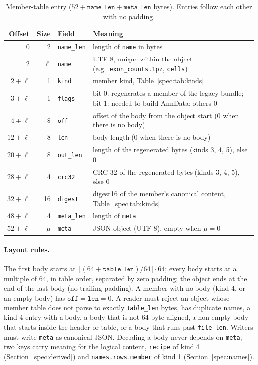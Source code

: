 \begin{table}[htbp]
\centering\footnotesize\setlength{\tabcolsep}{4pt}
\caption{Member-table entry ($52+\texttt{name\_len}+\texttt{meta\_len}$ bytes). Entries follow each other with no padding.}
\label{spec:tab:entry}
\begin{tabularx}{\linewidth}{@{}rrlX@{}}
\toprule
Offset & Size & Field & Meaning \\
\midrule
0     & 2  & \texttt{name\_len} & length of \texttt{name} in bytes \\
2     & $\ell$ & \texttt{name}  & UTF-8, unique within the object (e.g.\ \texttt{exon\_counts.1pz}, \texttt{cells}) \\
$2+\ell$  & 1 & \texttt{kind}  & member kind, Table~\ref{spec:tab:kinds} \\
$3+\ell$  & 1 & \texttt{flags} & bit 0: regenerates a member of the legacy bundle; bit 1: needed to build AnnData; others 0 \\
$4+\ell$  & 8 & \texttt{off}   & offset of the body from the object start (0 when there is no body) \\
$12+\ell$ & 8 & \texttt{len}   & body length (0 when there is no body) \\
$20+\ell$ & 8 & \texttt{out\_len} & length of the regenerated bytes (kinds 3, 4, 5), else 0 \\
$28+\ell$ & 4 & \texttt{crc32}  & CRC-32 of the regenerated bytes (kinds 3, 4, 5), else 0 \\
$32+\ell$ & 16 & \texttt{digest} & digest16 of the member's canonical content, Table~\ref{spec:tab:kinds} \\
$48+\ell$ & 4 & \texttt{meta\_len} & length of \texttt{meta} \\
$52+\ell$ & $\mu$ & \texttt{meta} & JSON object (UTF-8), empty when $\mu=0$ \\
\bottomrule
\end{tabularx}
\end{table}

\paragraph{Layout rules.}
The first body starts at $\lceil(64+\texttt{table\_len})/64\rceil\cdot 64$; every body starts at a multiple of 64,
in table order, separated by zero padding; the object ends at the end of the last body (no trailing padding).
A member with no body (kind 4, or an empty body) has $\texttt{off}=\texttt{len}=0$. A reader must reject an object
whose member table does not parse to exactly \texttt{table\_len} bytes, has duplicate names, a kind-4 entry with a body,
a body that is not 64-byte aligned, a non-empty body that starts inside the header or table, or a body that runs past
\texttt{file\_len}. Writers must write \texttt{meta} as canonical JSON. Decoding a body never depends on \texttt{meta};
two keys carry meaning for the logical content, \texttt{recipe} of kind 4 (Section~\ref{spec:derived}) and
\texttt{names.rows.member} of kind 1 (Section~\ref{spec:names}).

